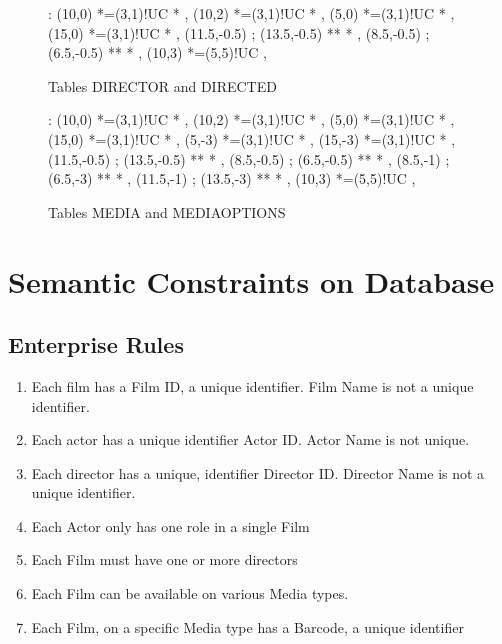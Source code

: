 \documentclass[a4paper,12pt]{article}
\newcommand{\primarykey}[1]{\mbox{{\color{NavyBlue}{$#1$}}}}
\newcommand{\foreignkey}[1]{{\mbox{\color{Emerald}{$#1$}}}}
\begin{document}
\begin{figure}[h]

\xy<1cm,0cm>:
(10,0) *=(3,1)!UC\txt{\primarykey{Director ID}} *\frm{-} ,
(10,2) *=(3,1)!UC\txt{\foreignkey{Film ID}} *\frm{-} ,
(5,0) *=(3,1)!UC *\frm{-} ,
(15,0) *=(3,1)!UC *\frm{-} ,
(11.5,-0.5) ; (13.5,-0.5) **\dir{-}  *\dir{>} ,
(8.5,-0.5) ; (6.5,-0.5) **\dir{-}  *\dir{>} ,
(10,3) *=(5,5)!UC\frm{-} ,
\endxy

\caption{Tables DIRECTOR and DIRECTED}

\end{figure}

\begin{figure}[h]

\xy<1cm,0cm>:
(10,0) *=(3,1)!UC\txt{\primarykey{Barcode}} *\frm{-} ,
(10,2) *=(3,1)!UC\txt{\foreignkey{Film ID}} *\frm{-} ,
(5,0) *=(3,1)!UC *\frm{-} ,
(15,0) *=(3,1)!UC *\frm{-} ,
(5,-3) *=(3,1)!UC *\frm{-} ,
(15,-3) *=(3,1)!UC *\frm{-} ,
(11.5,-0.5) ; (13.5,-0.5) **\dir{-}  *\dir{>} ,
(8.5,-0.5) ; (6.5,-0.5) **\dir{-}  *\dir{>} ,
(8.5,-1) ; (6.5,-3) **\dir{-}  *\dir{>} ,
(11.5,-1) ; (13.5,-3) **\dir{-}  *\dir{>} ,
(10,3) *=(5,5)!UC\frm{-} ,
\endxy

\caption{Tables MEDIA and MEDIAOPTIONS}

\end{figure}

\section{Semantic Constraints on Database}

\subsection{Enterprise Rules}

\begin{enumerate}
\item Each film has a Film ID, a unique identifier. Film Name is not a 
unique identifier.

\item Each actor has a unique identifier Actor ID. Actor Name is not
unique.

\item Each director has a unique, identifier Director ID. Director Name
is not a unique identifier.

\item Each Actor only has one role in a single Film

\item Each Film must have one or more directors

\item Each Film can be available on various Media types.

\item Each Film, on a specific Media type has a Barcode, a unique 
identifier
\end{enumerate}
\end{document}
